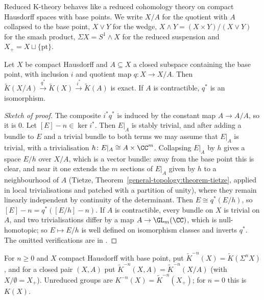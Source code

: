 Reduced K-theory behaves like a reduced cohomology theory on compact Hausdorff spaces with base points. We write $X/A$ for the quotient with $A$ collapsed to the base point, $X \vee Y$ for the wedge,
$X \wedge Y = (X \times Y)/(X \vee Y)$ for the smash product, $\Sigma X = S^1 \wedge X$ for the reduced suspension and $X_+ = X \sqcup \{\mathrm{pt}\}$.

\begin{proposition}\label{k-theory:proposition-exact-pair}
Let $X$ be compact Hausdorff and $A \subseteq X$ a closed subspace containing the base point, with inclusion $i$ and quotient map $q \colon X \to X/A$. Then
$\tilde{K}(X/A) \xrightarrow{q^*} \tilde{K}(X) \xrightarrow{i^*} \tilde{K}(A)$ is exact. If $A$ is contractible, $q^*$ is an isomorphism.
\end{proposition}

\begin{proof}[Sketch of proof]
The composite $i^*q^*$ is induced by the constant map $A \to A/A$, so it is $0$. Let $[E] - n \in \ker i^*$. Then $E|_A$ is stably trivial, and after adding a bundle to $E$ and a trivial bundle to both terms we may
assume that $E|_A$ is trivial, with a trivialisation $h \colon E|_A \cong A \times \CC^m$. Collapsing $E|_A$ by $h$ gives a space $E/h$ over $X/A$, which is a vector bundle: away from the base point this is clear,
and near it one extends the $m$ sections of $E|_A$ given by $h$ to a neighbourhood of $A$ (Tietze, Theorem~\ref{general-topology:theorem-tietze}, applied in local trivialisations and patched with a partition of unity),
where they remain linearly independent by continuity of the determinant. Then $E \cong q^*(E/h)$, so $[E] - n = q^*([E/h] - n)$. If $A$ is contractible, every bundle on $X$ is trivial on $A$, and two trivialisations
differ by a map $A \to \GL_m(\CC)$, which is null-homotopic; so $E \mapsto E/h$ is well defined on isomorphism classes and inverts $q^*$. The omitted verifications are in \cite[Chapter 2]{hatcher-vbkt}.
\end{proof}

\begin{definition}\label{k-theory:definition-negative-k}
For $n \geq 0$ and $X$ compact Hausdorff with base point, put $\tilde{K}^{-n}(X) = \tilde{K}(\Sigma^nX)$, and for a closed pair $(X, A)$ put $\tilde{K}^{-n}(X, A) = \tilde{K}^{-n}(X/A)$ (with
$X/\emptyset = X_+$). Unreduced groups are $K^{-n}(X) = \tilde{K}^{-n}(X_+)$; for $n = 0$ this is $K(X)$.
\end{definition}

